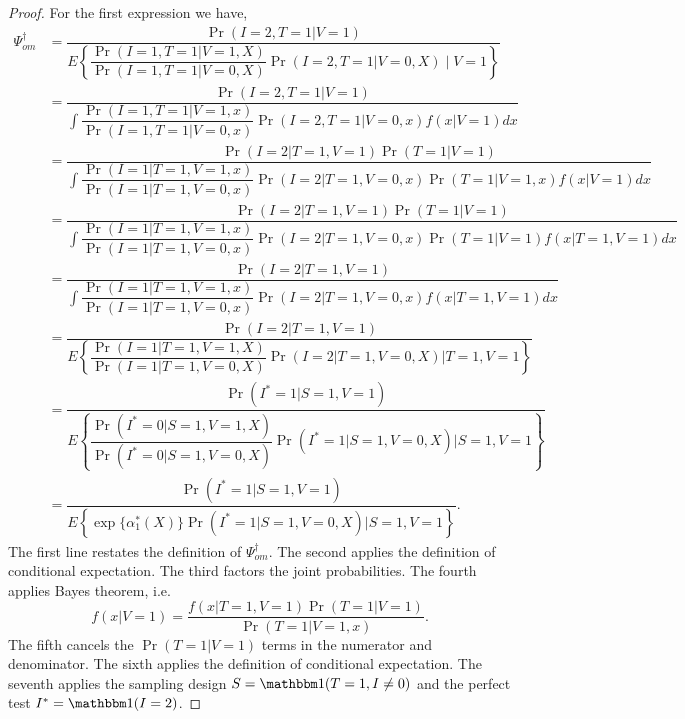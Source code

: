 \begin{appendix}
    \begin{proof}
    For the first expression we have,
        \begin{align*}
        \Psi^\dagger_{om} &= \dfrac{\Pr(I=2, T = 1|V=1)}{E\left\{ \dfrac{\Pr(I = 1, T = 1 | V = 1, X)}{\Pr(I = 1, T = 1 | V = 0, X)}\Pr(I = 2, T = 1 | V = 0, X) \mid  V = 1\right\}} \\
        &= \dfrac{\Pr(I = 2, T = 1 | V = 1)}{\int \dfrac{\Pr(I = 1, T = 1 | V = 1, x)}{\Pr(I = 1, T = 1 | V = 0, x)} \Pr(I = 2, T = 1 | V = 0, x) f(x | V = 1) dx} \\
        &= \dfrac{\Pr(I = 2 | T = 1, V = 1)\Pr(T = 1 | V = 1)}{\int \dfrac{\Pr(I = 1 | T = 1, V = 1, x)}{\Pr(I = 1 | T = 1, V = 0, x)} \Pr(I = 2 | T = 1, V = 0, x) \Pr(T = 1 | V = 1, x) f(x | V = 1) dx} \\
        &= \dfrac{\Pr(I = 2 | T = 1, V = 1)\Pr(T = 1 | V = 1)}{\int \dfrac{\Pr(I = 1 | T = 1, V = 1, x)}{\Pr(I = 1 | T = 1, V = 0, x)} \Pr(I = 2 | T = 1, V = 0, x) \Pr(T = 1 | V = 1) f(x | T =1, V = 1) dx} \\
        &= \dfrac{\Pr(I = 2 | T = 1, V = 1)}{\int \dfrac{\Pr(I = 1 | T = 1, V = 1, x)}{\Pr(I = 1 | T = 1, V = 0, x)} \Pr(I = 2 | T = 1, V = 0, x) f(x | T =1, V = 1) dx} \\
        &= \dfrac{\Pr(I = 2 | T = 1, V = 1)}{E\left\{ \dfrac{\Pr(I = 1 | T = 1, V = 1, X)}{\Pr(I = 1 | T = 1, V = 0, X)} \Pr(I = 2 | T = 1, V = 0, X) \bigg| T = 1, V = 1\right\}} \\
        &= \dfrac{\Pr(I^* = 1 | S = 1, V = 1)}{E\left\{ \dfrac{\Pr(I^* = 0 | S = 1, V = 1, X)}{\Pr(I^* = 0 | S = 1, V = 0, X)} \Pr(I^* = 1 | S = 1, V = 0, X) \bigg| S = 1, V = 1\right\}} \\
        &= \dfrac{\Pr(I^* = 1 | S = 1, V = 1)}{E\left\{ \exp\{\alpha^*_1(X)\} \Pr(I^* = 1 | S = 1, V = 0, X) \Big| S = 1, V = 1 \right\}}.
    \end{align*}
    The first line restates the definition of $\Psi^\dagger_{om}$. The second applies the definition of conditional expectation. The third factors the joint probabilities. The fourth applies Bayes theorem, i.e. 
    \begin{equation*}
        f(x | V = 1) = \dfrac{f(x | T = 1, V = 1)\Pr(T = 1 | V = 1)}{\Pr(T = 1 | V = 1, x)}.
    \end{equation*}
    The fifth cancels the $\Pr(T = 1 |V = 1)$ terms in the numerator and denominator. The sixth applies the definition of conditional expectation. The seventh applies the sampling design $S = \mathbbm 1 (T = 1, I \neq 0)$ and the perfect test $I^* = \mathbbm 1(I = 2)$.
    

\end{proof}
\end{appendix}
